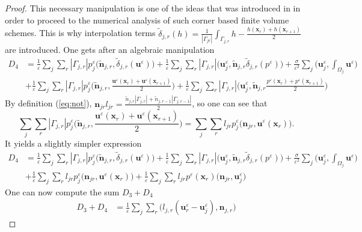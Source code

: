 \documentclass[a4paper,french,english,10pt]{article}
\newcommand\ljr{l_{jr}}
\newcommand\njr{\mathbf{n}_{jr}}
\newcommand\tnjr{\mathbf{\tilde{n}}_{j,r}}
\newcommand\uu{\mathbf{u}}
\newcommand\eps{\varepsilon}
\begin{document}
\begin{proof}
This necessary manipulation is one of the ideas that was introduced
in \cite{Mazeran} in order to proceed to the numerical
analysis of such corner based finite volume schemes.
This is why  interpolation terms  $\tilde{\delta}_{j,r}(h)= 
\frac1{|\Gamma_{jr}|}\int_{\Gamma_{j,r}} h
- \frac{h(\textbf{x}_{r})+h(\textbf{x}_{r+1})}{2}$ are introduced.
One gets after an algebraic manipulation 
\begin{equation*}
\begin{aligned}
D_4 &= \frac{1}{\eps}\sum_j \sum_r |\Gamma_{j,r}|   p_j^{\eps} \bigg( \tnjr
,\tilde{\delta}_{j,r}(\uu^{\eps}) \bigg) +\frac{1}{\eps}\sum_j \sum_r
|\Gamma_{j,r}| 
\bigg( \textbf{u}_j^{\eps} ,
\tnjr\tilde{\delta}_{j,r}(p^{\eps})\bigg) +
\frac{\sigma}{\eps^2}\sum_j\bigg(  \textbf{u}_j^{\eps} ,
\int_{\Omega_j}\uu^{\eps} \bigg)\\
&+ \frac{1}{\eps}\sum_j \sum_r  |\Gamma_{j,r}| p_j^{\eps} \bigg(
\tnjr ,\frac{\uu^{\eps}(\textbf{x}_{r})+\uu^{\eps}(\textbf{x}_{r+1})}{2}
\bigg) + \frac{1}{\eps}\sum_j \sum_r |\Gamma_{j,r}| \bigg( \textbf{u}_j^{\eps} ,
\tnjr
\frac{p^{\eps}(\textbf{x}_{r})+p^{\eps}(\textbf{x}_{r+1})}{2}\bigg) 
\end{aligned}
\end{equation*}
By definition (\ref{eq:not}),
$\njr\ljr=\frac{\tilde{n}_{j,r}|\Gamma_{j,r}|+\tilde{n}_{j,r-1}|\Gamma_{j,r-1}|}
{2}$, so one can see that 
$$
\sum_j \sum_r |\Gamma_{j,r}|  p_j^{\eps} \bigg(
\tnjr ,\frac{\uu^{\eps}(\textbf{x}_{r})+\uu^{\eps}(\textbf{x}_{r+1})}{2}
\bigg)= \sum_j \sum_r  l_{jr} p_j^{\eps} \big( \njr ,\uu^{\eps}(\textbf{x}_{r}) \big).
$$ 
It yields a slightly simpler expression
$$
\begin{aligned}
D_4 &= \frac{1}{\eps}\sum_j \sum_r |\Gamma_{j,r}|   p_j^{\eps} \bigg( \tnjr
,\tilde{\delta}_{j,r}(\uu^{\eps}) \bigg) +\frac{1}{\eps}\sum_j \sum_r
|\Gamma_{j,r}| 
\bigg( \textbf{u}_j^{\eps} ,
\tnjr\tilde{\delta}_{j,r}(p^{\eps})\bigg) +
\frac{\sigma}{\eps^2}\sum_j\bigg(  \textbf{u}_j^{\eps} ,
\int_{\Omega_j}\uu^{\eps} \bigg)\\
&+ \frac{1}{\eps}
\sum_j \sum_r  l_{jr} p_j^{\eps} \big( \njr ,\uu^{\eps}(\textbf{x}_{r}) \big)
 + \frac{1}{\eps}\sum_j \sum_r \ljr p^{\eps}(\textbf{x}_{r})\big(\njr ,\textbf{u}_j^{\eps}\big) 
\end{aligned}
$$
One can now compute the sum  $D_3+D_4$
\begin{equation*}
\begin{aligned}
D_3+D_4 &= \frac{1}{\eps} \sum_j \sum_r \bigg(
l_{j,r}(\textbf{u}_r^{\eps}-\textbf{u}_j^{\eps}),\textbf{n}_{j,r} \bigg)

\end{aligned}
\end{equation*}
\end{proof}
\end{document}
